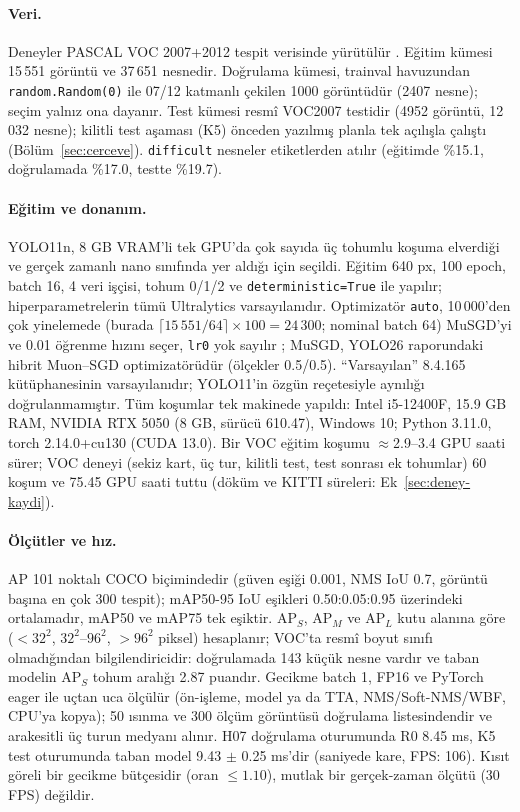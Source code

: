\documentclass[pdflatex,iicol,sn-mathphys-num]{sn-jnl}
\begin{document}
\paragraph{Veri.}
Deneyler PASCAL VOC 2007+2012 tespit verisinde yürütülür \cite{everingham_2010_voc}. Eğitim kümesi 15\,551 görüntü ve 37\,651 nesnedir. Doğrulama kümesi, trainval havuzundan \texttt{random.Random(0)} ile 07/12 katmanlı çekilen 1000 görüntüdür (2407 nesne); seçim yalnız ona dayanır. Test kümesi resmî VOC2007 testidir (4952 görüntü, 12\,032 nesne); kilitli test aşaması (K5) önceden yazılmış planla tek açılışla çalıştı (Bölüm~\ref{sec:cerceve}). \texttt{difficult} nesneler etiketlerden atılır (eğitimde \%15.1, doğrulamada \%17.0, testte \%19.7).

\paragraph{Eğitim ve donanım.}
YOLO11n, 8 GB VRAM'li tek GPU'da çok sayıda üç tohumlu koşuma elverdiği ve gerçek zamanlı nano sınıfında yer aldığı için seçildi. Eğitim 640 px, 100 epoch, batch 16, 4 veri işçisi, tohum 0/1/2 ve \texttt{deterministic=True} ile yapılır; hiperparametrelerin tümü Ultralytics varsayılanıdır. Optimizatör \texttt{auto}, 10\,000'den çok yinelemede (burada $\lceil 15\,551/64\rceil\times 100=24\,300$; nominal batch 64) MuSGD'yi ve 0.01 öğrenme hızını seçer, \texttt{lr0} yok sayılır \cite{ultralytics_2026_v84165}; MuSGD, YOLO26 raporundaki hibrit Muon--SGD optimizatörüdür \cite{jocher_2026_yolo26} (ölçekler 0.5/0.5). ``Varsayılan'' 8.4.165 kütüphanesinin varsayılanıdır; YOLO11'in özgün reçetesiyle aynılığı doğrulanmamıştır. Tüm koşumlar tek makinede yapıldı: Intel i5-12400F, 15.9 GB RAM, NVIDIA RTX 5050 (8 GB, sürücü 610.47), Windows 10; Python 3.11.0, torch 2.14.0+cu130 (CUDA 13.0). Bir VOC eğitim koşumu $\approx$2.9--3.4 GPU saati sürer; VOC deneyi (sekiz kart, üç tur, kilitli test, test sonrası ek tohumlar) 60 koşum ve 75.45 GPU saati tuttu (döküm ve KITTI süreleri: Ek~\ref{sec:deney-kaydi}).

\paragraph{Ölçütler ve hız.}
AP 101 noktalı COCO biçimindedir \cite{lin_2014_coco} (güven eşiği 0.001, NMS IoU 0.7, görüntü başına en çok 300 tespit); mAP50-95 IoU eşikleri 0.50:0.05:0.95 üzerindeki ortalamadır, mAP50 ve mAP75 tek eşiktir. AP$_S$, AP$_M$ ve AP$_L$ kutu alanına göre ($<32^2$, $32^2$--$96^2$, $>96^2$ piksel) hesaplanır; VOC'ta resmî boyut sınıfı olmadığından bilgilendiricidir: doğrulamada 143 küçük nesne vardır ve taban modelin AP$_S$ tohum aralığı 2.87 puandır. Gecikme batch 1, FP16 ve PyTorch eager ile uçtan uca ölçülür (ön-işleme, model ya da TTA, NMS/Soft-NMS/WBF, CPU'ya kopya); 50 ısınma ve 300 ölçüm görüntüsü doğrulama listesindendir ve arakesitli üç turun medyanı alınır. H07 doğrulama oturumunda R0 8.45 ms, K5 test oturumunda taban model 9.43 $\pm$ 0.25 ms'dir (saniyede kare, FPS: 106). Kısıt göreli bir gecikme bütçesidir (oran $\le1.10$), mutlak bir gerçek-zaman ölçütü (30 FPS) değildir.
\end{document}
